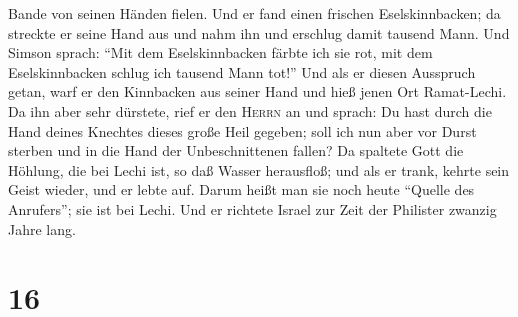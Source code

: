 Bande von seinen Händen fielen.  Und er fand einen
frischen Eselskinnbacken; da streckte er seine Hand aus und nahm ihn und
erschlug damit tausend Mann.  Und Simson sprach: ``Mit
dem Eselskinnbacken färbte ich sie rot, mit dem Eselskinnbacken schlug
ich tausend Mann tot!''  Und als er diesen Ausspruch
getan, warf er den Kinnbacken aus seiner Hand und hieß jenen Ort
Ramat-Lechi.  Da ihn aber sehr dürstete, rief er den
\textsc{Herrn} an und sprach: Du hast durch die Hand deines Knechtes
dieses große Heil gegeben; soll ich nun aber vor Durst sterben und in
die Hand der Unbeschnittenen fallen?  Da spaltete Gott
die Höhlung, die bei Lechi ist, so daß Wasser herausfloß; und als er
trank, kehrte sein Geist wieder, und er lebte auf. Darum heißt man sie
noch heute ``Quelle des Anrufers''; sie ist bei Lechi. 
Und er richtete Israel zur Zeit der Philister zwanzig Jahre lang.

\hypertarget{section-15}{%
\section{16}\label{section-15}}

